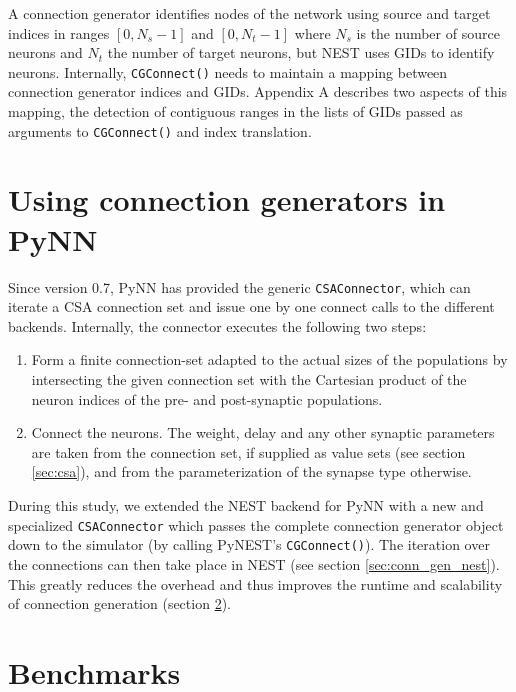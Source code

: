\documentclass{frontiersSCNS} %
\begin{document}
A connection generator identifies nodes of the network using source
and target indices in ranges $[0, N_s-1]$ and $[0, N_t-1]$ where $N_s$
is the number of source neurons and $N_t$ the number of target
neurons, but NEST uses GIDs to identify neurons.  Internally,
\verb|CGConnect()| needs to maintain a mapping between connection
generator indices and GIDs.  Appendix A describes two aspects of this
mapping, the detection of contiguous ranges in the lists of GIDs
passed as arguments to \verb|CGConnect()| and index translation.


\section{Using connection generators in PyNN}\label{sec:conn_gen_pynn}

Since version 0.7, PyNN has provided the generic \verb|CSAConnector|, which can
iterate a CSA connection set and issue one by one connect calls to
the different backends. Internally, the connector executes the
following two steps:

\begin{enumerate}
\item Form a finite connection-set adapted to the actual sizes of the
  populations by intersecting the given connection set with the
  Cartesian product of the neuron indices of the pre- and
  post-synaptic populations.
\item Connect the neurons. The weight, delay and any other synaptic
  parameters are taken from the connection set, if supplied as value
  sets (see section \ref{sec:csa}), and from the parameterization of
  the synapse type otherwise.
\end{enumerate}

During this study, we extended the NEST backend for PyNN with a new
and specialized \verb|CSAConnector| which passes the complete
connection generator object down to the simulator (by calling PyNEST's
\verb|CGConnect()|). The iteration over the connections can then take
place in NEST (see section \ref{sec:conn_gen_nest}). This greatly
reduces the overhead and thus improves the runtime and scalability of
connection generation (section \ref{sec:benchmarks}).


\section{Benchmarks}\label{sec:benchmarks}
\end{document}
